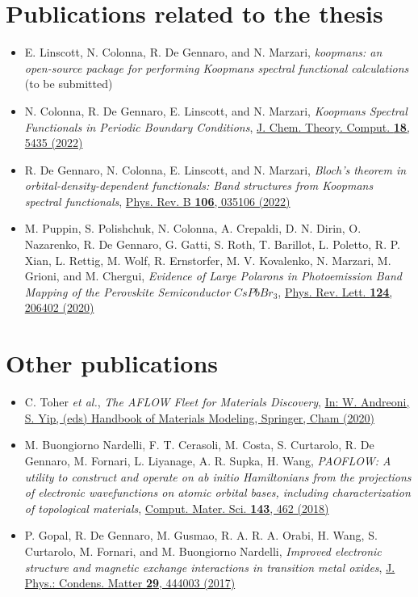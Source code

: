 \section*{Publications related to the thesis}

\begin{itemize}
    \item E. Linscott, N. Colonna, R. De Gennaro, and N. Marzari, \emph{koopmans: an open-source package for performing Koopmans spectral functional calculations} (to be submitted)
    \item N. Colonna, R. De Gennaro, E. Linscott, and N. Marzari, \emph{Koopmans Spectral Functionals in Periodic Boundary Conditions}, \href{https://doi.org/10.1021/acs.jctc.2c00161}{J. Chem. Theory. Comput. \textbf{18}, 5435 (2022)} \vfill
    \item R. De Gennaro, N. Colonna, E. Linscott, and N. Marzari, \emph{Bloch's theorem in orbital-density-dependent functionals: Band structures from Koopmans spectral functionals}, \href{https://link.aps.org/doi/10.1103/PhysRevB.106.035106}{Phys. Rev. B \textbf{106}, 035106 (2022)}
    \item M. Puppin, S. Polishchuk, N. Colonna, A. Crepaldi, D. N. Dirin, O. Nazarenko, R. De Gennaro, G. Gatti, S. Roth, T. Barillot, L. Poletto, R. P. Xian, L. Rettig, M. Wolf, R. Ernstorfer, M. V. Kovalenko, N. Marzari, M. Grioni, and M. Chergui, \emph{Evidence of Large Polarons in Photoemission Band Mapping of the Perovskite Semiconductor $CsPbBr_3$}, \href{https://link.aps.org/doi/10.1103/PhysRevLett.124.206402}{Phys. Rev. Lett. \textbf{124}, 206402 (2020)}
\end{itemize}

\section*{Other publications}

\begin{itemize}
    \item C. Toher \emph{et al.}, \emph{The AFLOW Fleet for Materials Discovery}, \href{https://doi.org/10.1007/978-3-319-44677-6_63}{In: W. Andreoni, S. Yip, (eds) Handbook of Materials Modeling, Springer, Cham (2020)}
    \item M. Buongiorno Nardelli, F. T. Cerasoli, M. Costa, S. Curtarolo, R. De Gennaro, M. Fornari, L. Liyanage, A. R. Supka, H. Wang, \emph{PAOFLOW: A utility to construct and operate on ab initio Hamiltonians from the projections of electronic wavefunctions on atomic orbital bases, including characterization of topological materials}, \href{http://www.sciencedirect.com/science/article/pii/S0927025617306651}{Comput. Mater. Sci. \textbf{143}, 462 (2018)}
    \item P. Gopal, R. De Gennaro, M. Gusmao, R. A. R. A. Orabi, H. Wang, S. Curtarolo, M. Fornari, and M. Buongiorno Nardelli, \emph{Improved electronic structure and magnetic exchange interactions in transition metal oxides}, \href{https://doi.org/10.1088%2F1361-648x%2Faa8643}{J. Phys.: Condens. Matter \textbf{29}, 444003 (2017)}
\end{itemize}


